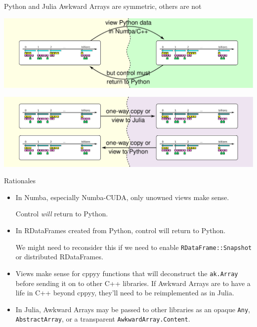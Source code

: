 \documentclass[aspectratio=169]{beamer}
\begin{document}
\begin{frame}{Python and Julia Awkward Arrays are symmetric, others are not}
\vspace{0.3 cm}

\begin{center}
\includegraphics[width=0.9\linewidth]{backends-usage-patterns.pdf}
\end{center}

\vspace{0.1 cm}
\begin{center}
\includegraphics[width=0.9\linewidth]{backends-usage-patterns-2.pdf}
\end{center}
\end{frame}

\begin{frame}{Rationales}
\large
\vspace{0.3 cm}

\begin{itemize}\setlength{\itemsep}{0.5 cm}
\item In Numba, especially Numba-CUDA, only unowned views make sense.

Control {\it will} return to Python.

\item In RDataFrames created from Python, control will return to Python.

We might need to reconsider this if we need to enable \texttt{RDataFrame::Snapshot} or distributed RDataFrames.

\item Views make sense for cppyy functions that will deconstruct the \texttt{ak.Array} before sending it on to other C++ libraries. If Awkward Arrays are to have a life in C++ beyond cppyy, they'll need to be reimplemented as in Julia.

\item In Julia, Awkward Arrays may be passed to other libraries as an opaque \texttt{Any}, \texttt{AbstractArray}, or a transparent \texttt{AwkwardArray.Content}.
\end{itemize}
\end{frame}
\end{document}
